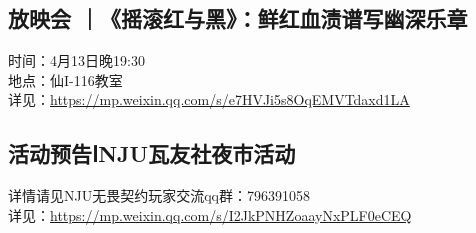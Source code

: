 \documentclass[letterpaper, 12pt]{article}
\begin{document}
\begin{multicols}{2}
\subsection{放映会 ｜《摇滚红与黑》：鲜红血渍谱写幽深乐章}
时间：4月13日晚19:30
\\地点：仙I-116教室
\\详见：\url{https://mp.weixin.qq.com/s/e7HVJi5s8OqEMVTdaxd1LA}


\subsection{活动预告ⅠNJU瓦友社夜市活动}
详情请见NJU无畏契约玩家交流qq群：796391058
\\详见：\url{https://mp.weixin.qq.com/s/I2JkPNHZoaayNxPLF0eCEQ}


\end{multicols}
\end{document}
